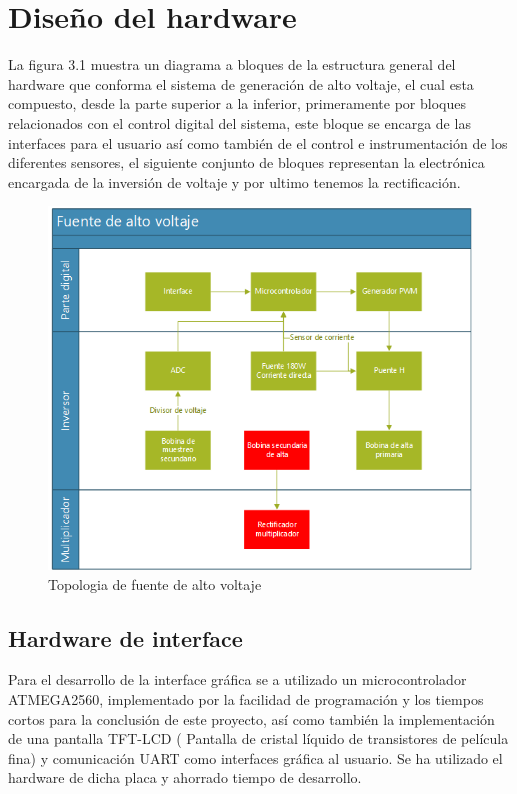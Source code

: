 \section{Diseño del hardware}


La figura 3.1 muestra un diagrama a bloques de la estructura general del hardware que conforma el sistema de generación de alto voltaje, el cual esta compuesto, desde la parte superior a la inferior, primeramente por bloques relacionados con el control digital del sistema, este bloque se encarga de las interfaces para el usuario así como también de el control e instrumentación de los diferentes sensores, el siguiente conjunto de bloques representan la electrónica encargada de la inversión de voltaje y por ultimo tenemos la rectificación.  \\

\begin{figure}[H]
\centering
\includegraphics[width=12
cm]{Capitulo3/figs/diagrama.png}
\caption{Topologia de fuente de alto voltaje}
\end{figure}
\subsection{Hardware de interface}
Para el desarrollo de la interface gráfica se a utilizado un microcontrolador ATMEGA2560, implementado por la facilidad de programación y los tiempos cortos para la conclusión de este proyecto, así como también la implementación de una pantalla TFT-LCD ( Pantalla de cristal líquido de transistores de película fina) y comunicación UART como interfaces gráfica al usuario. Se ha utilizado el hardware de dicha placa y ahorrado tiempo de desarrollo. \\


